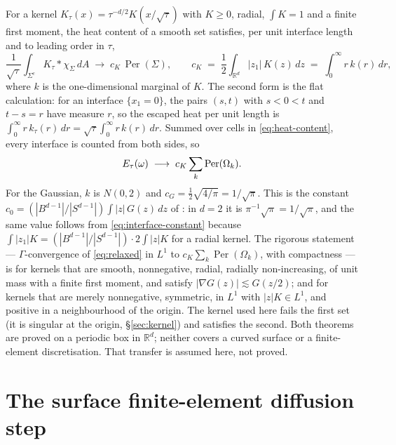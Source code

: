 \documentclass[11pt,a4paper]{article}
\begin{document}
For a kernel $K_\tau(x) = \tau^{-d/2} K(x/\sqrt\tau)$ with $K \ge 0$, radial,
$\int K = 1$ and a finite first moment, the heat content of a smooth set
satisfies, per unit interface length and to leading order in $\tau$,
\begin{equation}
  \frac{1}{\sqrt\tau} \int_{\Sigma^c} K_\tau * \chi_\Sigma \, dA
  \;\longrightarrow\; c_K \, \operatorname{Per}(\Sigma),
  \qquad
  c_K \;=\; \frac12 \int_{\mathbb{R}^d} |z_1| \, K(z)\, dz \;=\; \int_0^\infty r\, k(r)\, dr,
  \label{eq:interface-constant}
\end{equation}
where $k$ is the one-dimensional marginal of $K$. The second form is the flat
calculation: for an interface $\{x_1 = 0\}$, the pairs $(s, t)$ with
$s < 0 < t$ and $t - s = r$ have measure $r$, so the escaped heat per unit
length is $\int_0^\infty r\, k_\tau(r)\, dr = \sqrt\tau \int_0^\infty r\, k(r)\, dr$.
Summed over cells in \eqref{eq:heat-content}, every interface is counted from both
sides, so
\begin{equation}
  E_\tau(\omega) \;\longrightarrow\; c_K \sum_k \operatorname{Per}(\Omega_k).
  \label{eq:gamma-limit}
\end{equation}
For the Gaussian, $k$ is $N(0, 2)$ and $c_G = \tfrac12 \sqrt{4/\pi} = 1/\sqrt\pi$.
This is the constant $c_0 = (|B^{d-1}|/|S^{d-1}|) \int |z|\, G(z)\, dz$ of
\cite[eq.~(A.2)]{esedoglu2015threshold}: in $d = 2$ it is $\pi^{-1}\sqrt\pi = 1/\sqrt\pi$,
and the same value follows from \eqref{eq:interface-constant} because
$\int |z_1| K = (|B^{d-1}|/|S^{d-1}|)\cdot 2 \int |z| K$ for a radial kernel. The
rigorous statement --- $\Gamma$-convergence of \eqref{eq:relaxed} in $L^1$ to
$c_K \sum_k \operatorname{Per}(\Omega_k)$, with compactness --- is
\cite[Proposition~A.1]{esedoglu2015threshold} for kernels that are smooth,
nonnegative, radial, radially non-increasing, of unit mass with a finite first
moment, and satisfy $|\nabla G(z)| \lesssim G(z/2)$; and
\cite[Theorem~5.1]{esedoglu2017kernels} for kernels that are merely
nonnegative, symmetric, in $L^1$ with $|z|K \in L^1$, and positive in a
neighbourhood of the origin. The kernel used here fails the first set
(it is singular at the origin, \S\ref{sec:kernel}) and satisfies the second.
Both theorems are proved on a periodic box in $\mathbb{R}^d$; neither covers a
curved surface or a finite-element discretisation. That transfer is assumed
here, not proved.

\section{The surface finite-element diffusion step}
\label{sec:diffusion}
\end{document}
